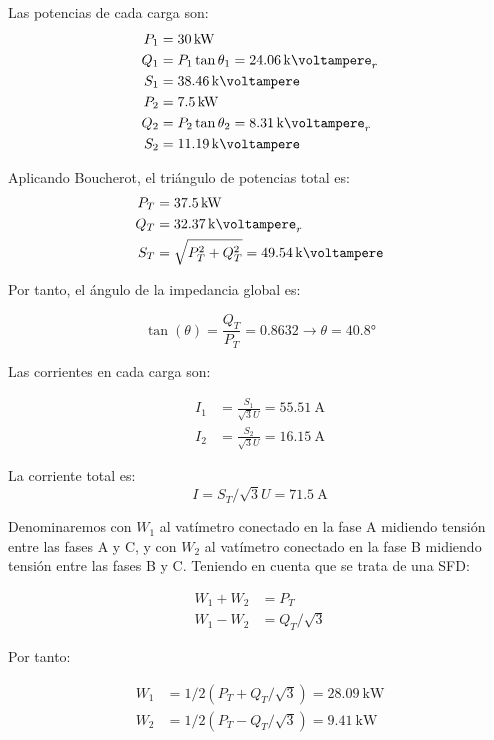 \documentclass[12pt]{article}
\begin{document}
\noindent\hrulefill

 Las potencias de cada carga son:
 \begin{align*}
   P_1 &= \SI{30}{\kilo\watt}\\
   Q_1 &= P_1\tan \theta_1 = \SI{24.06}{\kilo\voltampere}_r\\
   S_1 &= \SI{38.46}{\kilo\voltampere}\\
   P_2 &= \SI{7.5}{\kilo\watt}\\
   Q_2 &= P_2 \tan \theta_2 = \SI{8.31}{\kilo\voltampere}_r\\
   S_2 &= \SI{11.19}{\kilo\voltampere}
 \end{align*}

 Aplicando Boucherot, el triángulo de potencias total es:
 \begin{align*}
   P_T &= \SI{37.5}{\kilo\watt}\\
   Q_T &= \SI{32.37}{\kilo\voltampere}_r\\
   S_T &= \sqrt{P_T^2 + Q_T^2} = \SI{49.54}{\kilo\voltampere}
 \end{align*}

 Por tanto, el ángulo de la impedancia global es:

\[
  \tan(\theta) = \frac{Q_T}{P_T} = 0.8632 \rightarrow \theta =
  \ang{40.8}
\]

Las corrientes en cada carga son:

\begin{align*}
  I_1 &= \frac{S_1}{\sqrt{3} U} = \SI{55.51}{\ampere}\\
  I_2 &= \frac{S_2}{\sqrt{3} U} = \SI{16.15}{\ampere}
\end{align*}

La corriente total es:
\[
  I = S_T /{\sqrt{3} U} = \SI{71.5}{\ampere}
\]

Denominaremos con $W_1$ al vatímetro conectado en la fase A midiendo
tensión entre las fases A y C, y con $W_2$ al vatímetro conectado en
la fase B midiendo tensión entre las fases B y C. Teniendo en cuenta
que se trata de una SFD:
 
\begin{align*}
  W_1 + W_2 &= P_T\\
  W_1 - W_2 &= Q_T/\sqrt{3}
\end{align*}

Por tanto:

\begin{align*}
  W_1 &= 1/2 (P_T + Q_T/\sqrt{3}) = \SI{28.09}{\kilo\watt}\\
  W_2 &= 1/2 (P_T - Q_T/\sqrt{3}) = \SI{9.41}{\kilo\watt}
\end{align*}
\end{document}
